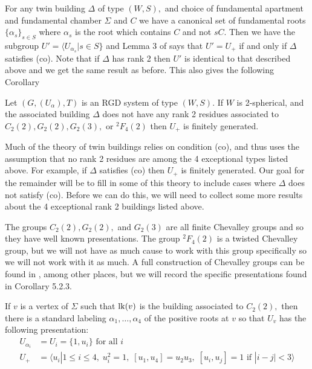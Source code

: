 \documentclass[class=book, crop=false,12 pt]{standalone}
\begin{document}
For any twin building $\Delta$ of type $(W,S),$ and choice of fundamental apartment and fundamental chamber $\Sigma$ and $C$ we have a canonical set of fundamental roots $\{\alpha_s\}_{s\in S}$ where $\alpha_s$ is the root which contains $C$ and not $sC.$ Then we have the subgroup $U'=\langle U_{\alpha_s}|s\in S\}$ and Lemma 3 of \cite{cop} says that $U'=U_+$ if and only if $\Delta$ satisfies (co). Note that if $\Delta$ has rank 2 then $U'$ is identical to that described above and we get the same result as before. This also gives the following Corollary

\begin{cor}
	\label{cor:cofg}
	Let $(G,(U_\alpha),T)$ is an RGD system of type $(W,S).$ If $W$ is 2-spherical, and the associated building $\Delta$ does not have any rank 2 residues associated to $C_2(2),G_2(2),G_2(3),$ or ${}^2F_4(2)$ then $U_+$ is finitely generated.
\end{cor}

Much of the theory of twin buildings relies on condition (co), and thus uses the assumption that no rank 2 residues are among the 4 exceptional types listed above. For example, if $\Delta$ satisfies (co) then $U_+$ is finitely generated. Our goal for the remainder will be to fill in some of this theory to include cases where $\Delta$ does not satisfy (co). Before we can do this, we will need to collect some more results about the 4 exceptional rank 2 buildings listed above.

The groups $C_2(2),G_2(2),$ and $G_2(3)$ are all finite Chevalley groups and so they have well known presentations. The group ${}^2F_4(2)$ is a twisted Chevalley group, but we will not have as much cause to work with this group specifically so we will not work with it as much. A full construction of Chevalley groups can be found in \cite{carter}, among other places, but we will record the specific presentations found in Corollary 5.2.3.

\begin{lemma}
	\label{lem:c22pres}
	If $v$ is a vertex of $\Sigma$ such that $\mathrm{lk}(v)$ is the building associated to $C_2(2),$ then there is a standard labeling $\alpha_1,\dots,\alpha_4$ of the positive roots at $v$ so that $U_v$ has the following presentation:
	\begin{align*}
		U_{\alpha_i}&=U_i=\{1,u_i\}\text{ for all }i\\
		U_+&=\langle u_i|1\le i\le 4,\;u_i^2=1,\;[u_1,u_4]=u_2u_3,\;[u_i,u_j]=1\text{ if }|i-j|<3\rangle
	\end{align*}
\end{lemma}
\end{document}
